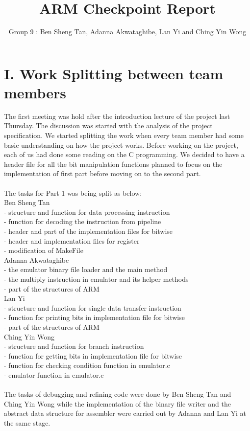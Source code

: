 \documentclass[11pt]{article}
\begin{document}
\title{ARM Checkpoint Report }
\author{Group 9 : Ben Sheng Tan, Adanna Akwataghibe, Lan Yi and Ching Yin Wong}

\maketitle

\section{I. Work Splitting between team members}


The first meeting was hold after the introduction lecture of the project last 
Thursday. The discussion was started with the analysis of the project 
specification. We started splitting the work when every team member had some 
basic understanding on how the project works. Before working on the project, 
each of us had done some reading on the C programming.  We decided to have a 
header file for all the bit manipulation functions planned to focus 
on the implementation of first part before moving on to the second part.\\
\\
The tasks for Part 1 was being split as below:\\
Ben Sheng Tan	\\
 - structure and function for data processing instruction \\
 - function for decoding the instruction from pipeline \\
 - header and part of the implementation files for bitwise \\
 - header and implementation files for register \\
 - modification of MakeFile \\
Adanna Akwataghibe\\
 - the emulator binary file loader and the main method \\
 - the multiply instruction in emulator and its helper methods\\
 - part of the structures of ARM\\
Lan Yi	\\
 - structure and function for single data transfer instruction\\
 - function for printing bits in implementation file for bitwise\\
 - part of the structures of ARM\\
Ching Yin Wong\\
 - structure and function for branch instruction\\
 - function for getting bits in implementation file for bitwise\\
 - function for checking condition function in emulator.c\\
 - emulator function in emulator.c\\
\\
The tasks of debugging and refining code were done by Ben Sheng Tan and Ching 
Yin Wong while the implementation of the binary file writer and the abstract 
data structure for assembler were carried out by Adanna and Lan Yi at the same 
stage.\\
\end{document}
